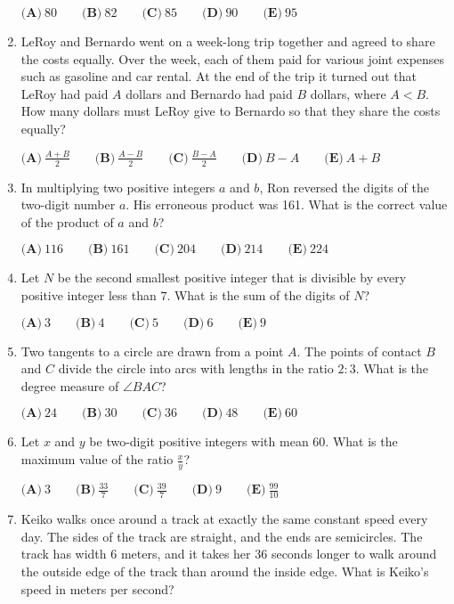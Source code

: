 \documentclass{article}
\begin{document}
\begin{enumerate}[label=\arabic*., itemsep=0.5em]
$\textbf{(A)}\ 80 \qquad \textbf{(B)}\ 82 \qquad \textbf{(C)}\ 85 \qquad \textbf{(D)}\ 90 \qquad \textbf{(E)}\ 95$\par \vspace{0.5em}\item LeRoy and Bernardo went on a week-long trip together and agreed to share the costs equally.  Over the week, each of them paid for various joint expenses such as gasoline and car rental.  At the end of the trip it turned out that LeRoy had paid $A$ dollars and Bernardo had paid $B$ dollars, where $A<B$.  How many dollars must LeRoy give to Bernardo so that they share the costs equally?

$\textbf{(A)}\ \frac{A+B}{2} \qquad \textbf{(B)}\ \frac{A-B}{2} \qquad \textbf{(C)}\ \frac{B-A}{2} \qquad \textbf{(D)}\ B-A \qquad \textbf{(E)}\ A+B$\par \vspace{0.5em}\item In multiplying two positive integers $a$ and $b$, Ron reversed the digits of the two-digit number $a$.  His erroneous product was 161.  What is the correct value of the product of $a$ and $b$?

$\textbf{(A)}\ 116 \qquad \textbf{(B)}\ 161 \qquad \textbf{(C)}\ 204 \qquad \textbf{(D)}\ 214 \qquad \textbf{(E)}\ 224$\par \vspace{0.5em}\item Let $N$ be the second smallest positive integer that is divisible by every positive integer less than $7$.  What is the sum of the digits of $N$?

$\textbf{(A)}\ 3 \qquad \textbf{(B)}\ 4 \qquad \textbf{(C)}\ 5 \qquad \textbf{(D)}\ 6 \qquad \textbf{(E)}\ 9$\par \vspace{0.5em}\item Two tangents to a circle are drawn from a point $A$.  The points of contact $B$ and $C$ divide the circle into arcs with lengths in the ratio $2 : 3$.  What is the degree measure of $\angle{BAC}$?

$\textbf{(A)}\ 24 \qquad \textbf{(B)}\ 30 \qquad \textbf{(C)}\ 36 \qquad \textbf{(D)}\ 48 \qquad \textbf{(E)}\ 60$\par \vspace{0.5em}\item Let $x$ and $y$ be two-digit positive integers with mean $60$.  What is the maximum value of the ratio $\frac{x}{y}$?

$\textbf{(A)}\ 3 \qquad \textbf{(B)}\ \frac{33}{7} \qquad \textbf{(C)}\ \frac{39}{7} \qquad \textbf{(D)}\ 9 \qquad \textbf{(E)}\ \frac{99}{10}$\par \vspace{0.5em}\item Keiko walks once around a track at exactly the same constant speed every day. The sides of the track are straight, and the ends are semicircles. The track has width $6$ meters, and it takes her $36$ seconds longer to walk around the outside edge of the track than around the inside edge. What is Keiko's speed in meters per second?


\end{enumerate}
\end{document}
